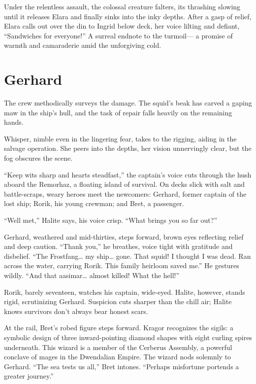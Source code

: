 \documentclass[
  letterpaper,12pt,twoside,twocolumn,openany,
  nodeprecatedcode,bg=full]{dndbook}
\begin{document}
Under the relentless assault, the colossal creature falters, its
thrashing slowing until it releases Elara and finally sinks into the
inky depths. After a gasp of relief, Elara calls out over the din to
Ingrid below deck, her voice lilting and defiant, ``Sandwiches for
everyone!'' A surreal endnote to the turmoil--- a promise of warmth and
camaraderie amid the unforgiving cold.

\section{Gerhard}\label{gerhard}

The crew methodically surveys the damage. The squid's beak has carved a
gaping maw in the ship's hull, and the task of repair falls heavily on
the remaining hands.

Whisper, nimble even in the lingering fear, takes to the rigging, aiding
in the salvage operation. She peers into the depths, her vision
unnervingly clear, but the fog obscures the scene.

``Keep wits sharp and hearts steadfast,'' the captain's voice cuts
through the hush aboard the Remorhaz, a floating island of survival. On
decks slick with salt and battle-scraps, weary heroes meet the
newcomers: Gerhard, former captain of the lost ship; Rorik, his young
crewman; and Bret, a passenger.

``Well met,'' Halite says, his voice crisp. ``What brings you so far
out?''

Gerhard, weathered and mid-thirties, steps forward, brown eyes
reflecting relief and deep caution. ``Thank you,'' he breathes, voice
tight with gratitude and disbelief. ``The Frostfang\ldots{} my
ship\ldots{} gone. That squid! I thought I was dead. Ran across the
water, carrying Rorik. This family heirloom saved me.'' He gestures
wildly. ``And that aasimar\ldots{} almost killed! What the hell!''

Rorik, barely seventeen, watches his captain, wide-eyed. Halite,
however, stands rigid, scrutinizing Gerhard. Suspicion cuts sharper than
the chill air; Halite knows survivors don't always bear honest scars.

At the rail, Bret's robed figure steps forward. Kragor recognizes the
sigils: a symbolic design of three inward-pointing diamond shapes with
eight curling spires underneath. This wizard is a member of the Cerberus
Assembly, a powerful conclave of mages in the Dwendalian Empire. The
wizard nods solemnly to Gerhard. ``The sea tests us all,'' Bret intones.
``Perhaps misfortune portends a greater journey.''
\end{document}
